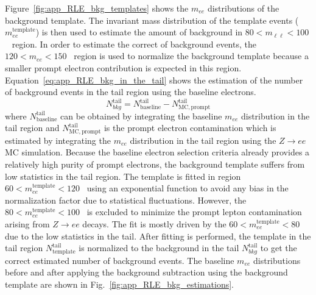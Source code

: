 Figure~\ref{fig:app_RLE_bkg_templates} shows the $m_{ee}$ distributions of the background template.
The invariant mass distribution of the template events ($m_{ee}^\mathrm{template}$) is then used to estimate the amount of background in $80 < m_{\ell \ell} < 100$~{\GeV} region.
In order to estimate the correct of background events, the $120 < m_{ee} < 150$~{\GeV} region is used to normalize the background template because a smaller prompt electron contribution is expected in this region.
Equation~\ref{eq:app_RLE_bkg_in_the_tail} shows the estimation of the number of background events in the tail region using the baseline electrons.
%
\begin{equation}
    N_{bkg}^\mathrm{tail} = N_\mathrm{baseline}^\mathrm{tail} - N_\mathrm{MC, prompt}^\mathrm{tail}
    \label{eq:app_RLE_bkg_in_the_tail}
\end{equation}
%
where $N_\mathrm{baseline}^\mathrm{tail}$ can be obtained by integrating the baseline $m_{ee}$ distribution in the tail region and $N_\mathrm{MC, prompt}^\mathrm{tail}$ is the prompt electron contamination which is estimated by integrating the $m_{ee}$ distribution in the tail region using the $Z \to ee$ MC simulation.
Because the baseline electron selection criteria already provides a relatively high purity of prompt electrons, the background template suffers from low statistics in the tail region.
The template is fitted in region $60 < m_{ee}^\mathrm{template} < 120$~{\GeV} using an exponential function to avoid any bias in the normalization factor due to statistical fluctuations.
However, the $80 < m_{ee}^\mathrm{template} < 100$~{\GeV} is excluded to minimize the prompt lepton contamination arising from $Z \to ee$ decays.
The fit is mostly driven by the $60 < m_{ee}^\mathrm{template} < 80$~{\GeV} due to the low statistics in the tail.
After fitting is performed, the template in the tail region $N_\mathrm{template}^\mathrm{tail}$ is normalized to the background in the tail $N_{bkg}^\mathrm{tail}$ to get the correct estimated number of background events.
The baseline $m_{ee}$ distributions before and after applying the background subtraction using the background template are shown in Fig.~\ref{fig:app_RLE_bkg_estimations}.

